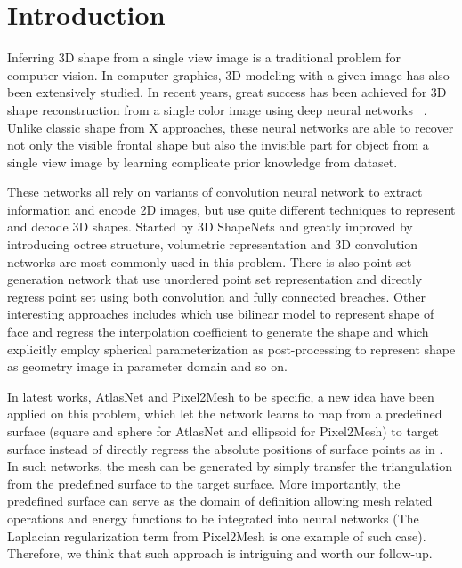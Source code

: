 \section{Introduction}
Inferring 3D shape from a single view image is a traditional problem for computer vision. In computer graphics, 3D modeling with a given image has also been extensively studied.  In recent years, great success has been achieved for 3D shape reconstruction from a single color image using deep neural networks~\cite{3DR2N2,PSGN} . Unlike classic shape from X  approaches, these neural networks are able to recover not only the visible frontal shape but also the invisible part for object from a single view image by learning complicate prior knowledge from dataset. 

These networks all rely on variants of convolution neural network to extract information and encode 2D images, but use quite different techniques to represent and decode 3D shapes. Started by 3D ShapeNets\cite{3dshapenet} and greatly improved by introducing octree structure\cite{octreegen}, volumetric representation and 3D convolution networks are most commonly used in this problem. There is also point set generation network\cite{PSGN} that use unordered point set representation and directly regress point set using both convolution and fully connected breaches. Other interesting approaches includes \cite{endface} which use bilinear model to represent shape of face and regress the interpolation coefficient to generate the shape and \cite{surfnet} which explicitly employ spherical parameterization as post-processing to represent shape as geometry image in parameter domain and so on.

In latest works, AtlasNet\cite{atlasnet} and Pixel2Mesh\cite{pixel2mesh} to be specific, a new idea have been applied on this problem, which let the network learns to map from a predefined surface (square and sphere for AtlasNet and ellipsoid for Pixel2Mesh) to target surface instead of directly regress the absolute positions of surface points as in \cite{PSGN}. In such networks, the mesh can be generated by simply transfer the triangulation from the predefined surface to the target surface. More importantly, the predefined surface can serve as the domain of definition allowing mesh related operations and energy functions to be integrated into neural networks (The Laplacian regularization term from Pixel2Mesh is one example of such case). Therefore, we think that such approach is intriguing and worth our follow-up.

